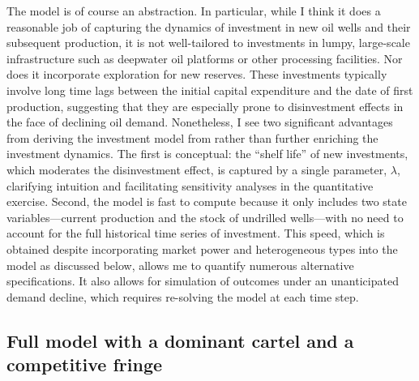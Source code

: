 \documentclass[12pt]{article}
\begin{document}
The model is of course an abstraction. In particular, while I think it does a reasonable job of capturing the dynamics of investment in new oil wells and their subsequent production, it is not well-tailored to investments in lumpy, large-scale infrastructure such as deepwater oil platforms or other processing facilities. Nor does it incorporate exploration for new reserves. These investments typically involve long time lags between the initial capital expenditure and the date of first production, suggesting that they are especially prone to disinvestment effects in the face of declining oil demand. Nonetheless, I see two significant advantages from deriving the investment model from \cite{aks2018} rather than further enriching the investment dynamics. The first is conceptual: the ``shelf life'' of new investments, which moderates the disinvestment effect, is captured by a single parameter, $\lambda$, clarifying intuition and facilitating sensitivity analyses in the quantitative exercise. Second, the model is fast to compute because it only includes two state variables---current production and the stock of undrilled wells---with no need to account for the full historical time series of investment. This speed, which is obtained despite incorporating market power and heterogeneous types into the model as discussed below, allows me to quantify numerous alternative specifications. It also allows for simulation of outcomes under an unanticipated demand decline, which requires re-solving the model at each time step.


\subsection{Full model with a dominant cartel and a competitive fringe} \label{sec:model_oligopoly}
\end{document}
